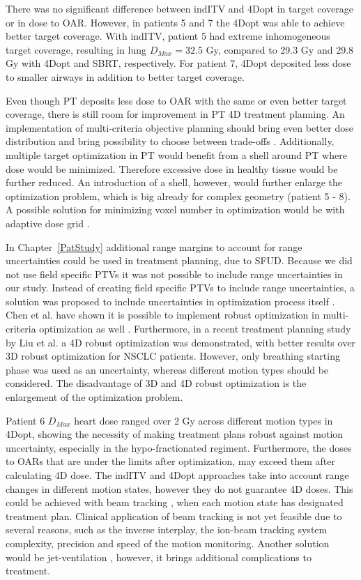 \documentclass[type=dr, dr=rernat, accentcolor=tud7b,colorbacktitle, bigchapter, openright, twoside, 12pt ]{tudthesis}
\begin{document}
There was no significant difference between indITV and 4Dopt in target coverage or in dose to OAR. 
However, in patients 5 and 7 the 4Dopt was able to achieve better target coverage. With indITV, patient 5 had extreme inhomogeneous target coverage, resulting in lung $D_{Max} = 32.5$ Gy,
compared to 29.3 Gy and 29.8 Gy with 4Dopt and SBRT, respectively. For patient 7, 4Dopt deposited less dose to smaller airways in addition to better target coverage.

Even though PT deposits less dose to OAR with the same or even better target coverage, there is still room for improvement in PT 4D treatment planning. 
An implementation of multi-criteria objective planning should bring even better dose distribution and bring possibility to choose between trade-offs \cite{Breedveld2007, Chen2010}. 
Additionally, multiple target optimization in PT would benefit from a shell around PT where dose would be minimized. Therefore excessive dose
in healthy tissue would be further reduced. An introduction of a shell, however, would further enlarge the optimization problem, which is big already for complex geometry (patient 5 - 8). 
A possible solution for minimizing voxel number in optimization would be with adaptive dose grid \cite{Prall2016a}.

In Chapter~\ref{PatStudy} additional range margins to account for range uncertainties could be used in treatment planning, due to SFUD. 
Because we did not use field specific PTVs it was not possible to include range uncertainties in our study.
Instead of creating field specific PTVs to include range uncertainties, a solution was proposed to include uncertainties in optimization process itself \cite{Pflugfelder2008, Unkelbach2009, Fredriksson2011, Chen2012}.
Chen et al. have shown it is possible to implement robust optimization in multi-criteria optimization as well \cite{Chen2012}. Furthermore, in a recent treatment planning study by Liu et al. \cite{Liu2016}
a 4D robust optimization was demonstrated, with better results over 3D robust optimization for NSCLC patients. However, only breathing starting phase was used as an uncertainty,
whereas different motion types should be considered. The disadvantage of 3D and 4D robust optimization is the enlargement of the optimization problem.

Patient 6 $D_{Max}$ heart dose ranged over 2 Gy across different motion types in 4Dopt, showing the necessity of making treatment plans robust against motion uncertainty, 
especially in the hypo-fractionated regiment. Furthermore, the doses to OARs that are under the limits after optimization, may exceed them after calculating 4D dose. 
The indITV and 4Dopt approaches take into account range changes in different motion states, however they do not guarantee 4D doses. This could be achieved with beam tracking \cite{Bert2007}, 
when each motion state has designated treatment plan. Clinical application of beam tracking is not yet feasible due to several reasons, such as the 
inverse interplay, the ion-beam tracking system complexity, precision and speed of the motion monitoring.
Another solution would be jet-ventilation \cite{Santiago2013}, however, it brings additional complications to treatment.
\end{document}
